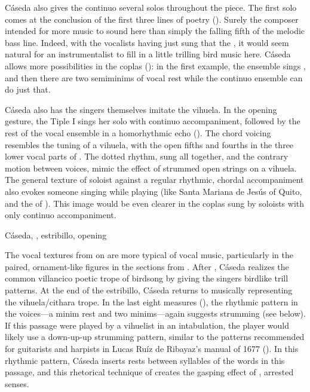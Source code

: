 Cáseda also gives the continuo several solos throughout the piece.
The first solo comes at the conclusion of the first three lines of poetry
().
Surely the composer intended for more music to sound here than simply the
falling fifth of the melodic bass line.
Indeed, with the vocalists having just sung that the , it would seem natural for an instrumentalist
to fill in a little trilling bird music here.
Cáseda allows more possibilities in the coplas (): in the first example, the ensemble sings , and then there are two semiminims of vocal rest while the
continuo ensemble can do just that.


Cáseda also has the singers themselves imitate the vihuela.
In the opening gesture, the Tiple I sings her solo with continuo accompaniment,
followed by the rest of the vocal ensemble in a homorhythmic echo
().
The chord voicing resembles the tuning of a vihuela, with the open fifths and
fourths in the three lower vocal parts of .
The dotted rhythm, sung all together, and the contrary motion between voices,
mimic the effect of strummed open strings on a vihuela.
The general texture of soloist against a regular rhythmic, chordal
accompaniment also evokes someone singing while playing (like Santa Mariana de
Jesús of Quito, and the  of ).
This image would be even clearer in the coplas sung by soloists with only
continuo accompaniment.


{Cáseda, , estribillo, opening}

The vocal textures from  on are more typical of vocal music,
particularly in the paired, ornament-like figures in the sections from
.
After , Cáseda realizes the common villancico poetic trope of
birdsong by giving the singers birdlike trill patterns. 
At the end of the estribillo, Cáseda returns to musically representing the
vihuela/cithara trope.
In the last eight measures (), the rhythmic pattern in the
voices---a minim rest and two minims---again suggests strumming (see
 below).
If this passage were played by a vihuelist in an intabulation, the player would
likely use a down-up-up strumming pattern, similar to the patterns recommended
for guitarists and harpists in Lucas Ruíz de Ribayaz's manual  of 1677 ().%
    \Autocite[9]{Ruiz:Luz}
In this rhythmic pattern, Cáseda inserts rests between syllables of the words
in this passage, and this rhetorical technique of  creates the
gasping effect of , arrested senses.

